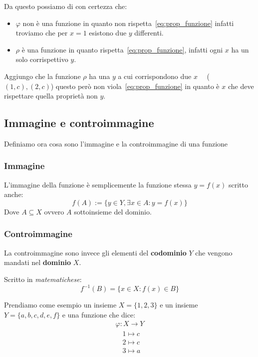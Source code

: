 \documentclass{article}
\theoremstyle{definition}
\begin{document}
Da questo possiamo di con certezza che:
\begin{itemize}
        \item $ \varphi$ non è una funzione in quanto non rispetta~\ref{eq:prop_funzione} infatti troviamo che per $ x = 1 $ esistono due $ y $ differenti. 
        \item $ \rho $ è una funzione in quanto rispetta~\ref{eq:prop_funzione}, infatti ogni $ x $ ha un solo corrispettivo $ y $.     
\end{itemize}

Aggiungo che la funzione $ \rho $ ha una $ y $ a cui corrispondono due $ x \quad $ ($ (1,c), (2,c) $) questo però non viola~\ref{eq:prop_funzione} in quanto è $ x $ che deve rispettare quella proprietà non $ y $.  



\subsection{Immagine e controimmagine}
Definiamo ora cosa sono l'immagine e la controimmagine di una funzione

\subsubsection{Immagine}
L'immagine della funzione è semplicemente la funzione stessa $ y = f(x) $ scritto anche:
\begin{equation*}
        f(A) := \{y \in Y, \exists x \in A : y = f(x) \}
\end{equation*}
Dove $ A \subseteq X $ ovvero $ A $ sottoinsieme del dominio. \newline  

\subsubsection{Controimmagine}
La controimmagine sono invece gli elementi del \textbf{codominio} $ Y $ che vengono mandati nel \textbf{dominio} $ X $. \par 
Scritto in \textit{matematichese}:
\begin{equation*}
        {f}^{-1}(B) = \{ x \in X : f(x) \in B  \}
\end{equation*}
 
Prendiamo come esempio un insieme $ X = \{1,2,3\}$ e un insieme $ Y = \{a,b,c,d,e,f\} $  e una funzione che dice:
\begin{align*}
        \varphi : X \to Y \\
        \quad 1 \mapsto c \\
        \quad 2 \mapsto c \\
        \quad 3 \mapsto a \\
\end{align*}
\end{document}
